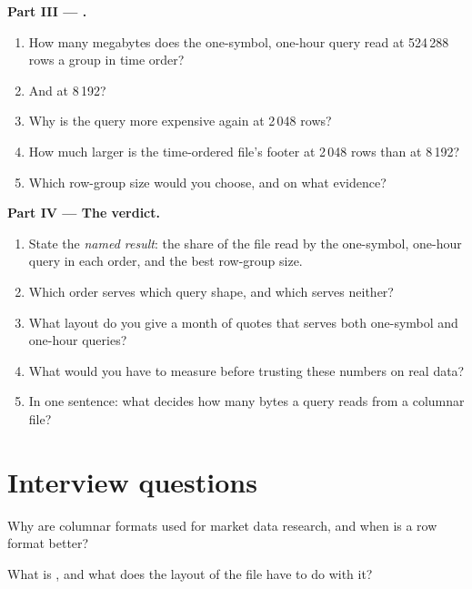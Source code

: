 \begin{problem}
\medskip\noindent\textbf{Part III --- .}
\begin{enumerate}[resume]
\item How many megabytes does the one-symbol, one-hour query read at 524\,288 rows a group in time order?
\item And at 8\,192?
\item Why is the query more expensive again at 2\,048 rows?
\item How much larger is the time-ordered file's footer at 2\,048 rows than at 8\,192?
\item Which row-group size would you choose, and on what evidence?
\end{enumerate}

\medskip\noindent\textbf{Part IV --- The verdict.}
\begin{enumerate}[resume]
\item State the \emph{named result}: the share of the file read by the one-symbol, one-hour query in each order, and the best
row-group size.
\item Which order serves which query shape, and which serves neither?
\item What layout do you give a month of quotes that serves both one-symbol and one-hour queries?
\item What would you have to measure before trusting these numbers on real data?
\item In one sentence: what decides how many bytes a query reads from a columnar file?
\end{enumerate}
\end{problem}

\section{Interview questions}

\begin{interviewq}\label{iq:pl:columnar-formats:1}
Why are columnar formats used for market data research, and when is a row format better?
\end{interviewq}

\begin{interviewq}\label{iq:pl:columnar-formats:2}
What is , and what does the layout of the file have to do with it?
\end{interviewq}


